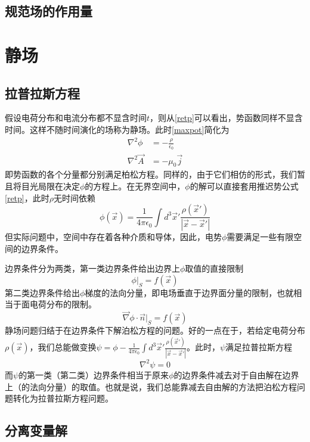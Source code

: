 \documentclass[a4paper,11pt]{ctexart}
\newcommand{\beq}{\begin{equation}}
\newcommand{\eeq}{\end{equation}}
\newcommand{\bea}{\begin{equation}\begin{aligned}}
\newcommand{\eea}{\end{aligned}\end{equation}}
\newcommand{\del}{\vec{\nabla}}
\newcommand{\epv}{\epsilon_0}
\begin{document}
\subsection{规范场的作用量}

\section{静场}
\subsection{拉普拉斯方程}
假设电荷分布和电流分布都不显含时间$t$，则从\cref{retp}可以看出，势函数同样不显含时间。这样不随时间演化的场称为静场。此时\cref{maxpot}简化为
\bea
\nabla^2 \phi &= - \frac{\rho}{\epv}\\
\nabla^2 \vec A &= - \mu_0 \vec j
\eea
即势函数的各个分量都分别满足柏松方程。同样的，由于它们相仿的形式，我们暂且将目光局限在决定$\phi$的方程上。在无界空间中，$\phi$的解可以直接套用推迟势公式\cref{retp}，此时$\rho$无时间依赖
\beq
\phi(\vec{x}) = \frac{1}{4\pi \epv} \int d^3 \vec{x}' \frac{\rho(\vec{x}')}{\left|\vec{x} - \vec{x}'\right|}
\eeq
但实际问题中，空间中存在着各种介质和导体，因此，电势$\phi$需要满足一些有限空间的边界条件。
\par
边界条件分为两类，第一类边界条件给出边界上$\phi$取值的直接限制
\beq
\phi \big|_{S} = f(\vec{x})
\eeq
第二类边界条件给出$\phi$梯度的法向分量，即电场垂直于边界面分量的限制，也就相当于面电荷分布的限制。
\beq
\del \phi \cdot \vec{n} \big|_S= f(\vec{x})
\eeq
静场问题归结于在边界条件下解泊松方程的问题。好的一点在于，若给定电荷分布$\rho(\vec{x})$，我们总能做变换$\psi = \phi - \frac{1}{4\pi \epv} \int d^3 \vec{x}' \frac{\rho(\vec{x}')}{\left|\vec{x} - \vec{x}'\right|}$。此时，$\psi$满足拉普拉斯方程
\beq
\nabla^2 \psi = 0
\eeq
而$\psi$的第一类（第二类）边界条件相当于原来$\phi$的边界条件减去对于自由解在边界上（的法向分量）的取值。也就是说，我们总能靠减去自由解的方法把泊松方程问题转化为拉普拉斯方程问题。

\subsection{分离变量解}
\end{document}
